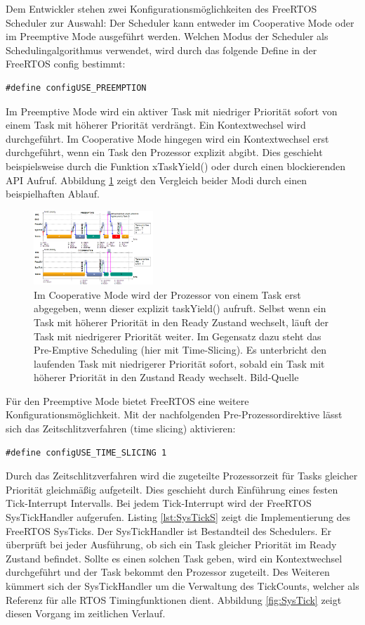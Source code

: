 Dem Entwickler stehen zwei Konfigurationsmöglichkeiten des FreeRTOS Scheduler zur Auswahl: Der Scheduler kann entweder im Cooperative Mode oder im Preemptive Mode ausgeführt werden. Welchen Modus der Scheduler als Schedulingalgorithmus verwendet, wird durch das folgende Define in der FreeRTOS config bestimmt:
\begin{lstlisting}[numbers = none]
#define configUSE_PREEMPTION
\end{lstlisting}
Im Preemptive Mode wird ein aktiver Task mit niedriger Priorität sofort von einem Task mit höherer Priorität verdrängt. Ein Kontextwechsel wird durchgeführt. Im Cooperative Mode hingegen wird ein Kontextwechsel erst durchgeführt, wenn ein Task den Prozessor explizit abgibt. Dies geschieht beispielsweise durch die Funktion xTaskYield() oder durch einen blockierenden API Aufruf. Abbildung \ref{fig:PreVSCo} zeigt den Vergleich beider Modi durch einen beispielhaften Ablauf. 
\begin{figure}[htb]
	\centering
		\includegraphics[width=0.4\textwidth]{Pictures/EMCUIT/PreemptiveCooperative.png}
	\caption{Im Cooperative Mode wird der Prozessor von einem Task erst abgegeben, wenn dieser explizit taskYield() aufruft. Selbst wenn ein Task mit höherer Priorität in den Ready Zustand wechselt, läuft der Task mit niedrigerer Priorität weiter. Im Gegensatz dazu steht das Pre-Emptive Scheduling (hier mit Time-Slicing). Es unterbricht den laufenden Task mit niedrigerer Priorität sofort, sobald ein Task mit höherer Priorität in den Zustand Ready wechselt. Bild-Quelle~\protect{}}
	\label{fig:PreVSCo}
\end{figure}
Für den Preemptive Mode bietet FreeRTOS eine weitere Konfigurationsmöglichkeit. Mit der nachfolgenden Pre-Prozessordirektive lässt sich das Zeitschlitzverfahren (time slicing) aktivieren: 
\begin{lstlisting}[numbers = none]
#define configUSE_TIME_SLICING 1
\end{lstlisting}
Durch das Zeitschlitzverfahren wird die zugeteilte Prozessorzeit für Tasks gleicher Priorität gleichmäßig aufgeteilt. Dies geschieht durch Ein\-füh\-rung eines festen Tick-Interrupt Intervalls. Bei jedem Tick-Interrupt wird der FreeRTOS SysTickHandler aufgerufen. Listing \ref{lst:SysTickS} zeigt die Implementierung des FreeRTOS SysTicks. Der SysTickHandler ist Bestandteil des Schedulers. Er überprüft bei jeder Ausführung, ob sich ein Task gleicher Priorität im Ready Zustand befindet. Sollte es einen solchen Task geben, wird ein Kontextwechsel durchgeführt und der Task bekommt den Prozessor zugeteilt. Des Weiteren kümmert sich der SysTickHandler um die Verwaltung des TickCounts, welcher als Referenz für alle RTOS Timingfunktionen dient. Abbildung \ref{fig:SysTick} zeigt diesen Vorgang im zeitlichen Verlauf.
